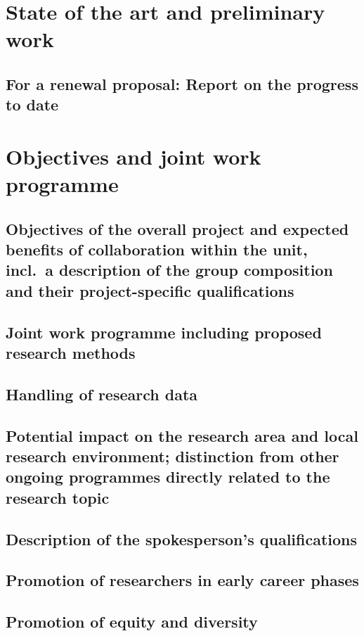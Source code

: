 \documentclass[english, 53.02]{proposal}
\begin{document}
\section{State of the art and preliminary work}

\subsection{For a renewal proposal: Report on the progress to date}


\section{Objectives and joint work programme}

\subsection{Objectives of the overall project and expected benefits of collaboration within the unit, incl.\ a description of the group composition and their project-specific qualifications}

\subsection{Joint work programme including proposed research methods}

\subsection{Handling of research data}

\subsection{Potential impact on the research area and local research environment; distinction from other ongoing programmes directly related to the research topic}

\subsection{Description of the spokesperson's qualifications}

\subsection{Promotion of researchers in early career phases}

\subsection{Promotion of equity and diversity}
\end{document}
